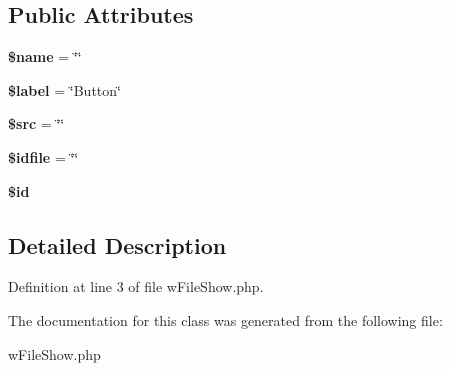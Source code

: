 \subsection*{Public Attributes}
\begin{DoxyCompactItemize}
\item 
\hypertarget{classwFileShow_a7cb7cb1f8a1a63cc58bfae35b4d3b0e1}{
{\bfseries \$name} = \char`\"{}\char`\"{}}
\label{classwFileShow_a7cb7cb1f8a1a63cc58bfae35b4d3b0e1}

\item 
\hypertarget{classwFileShow_af9bad721eb1965e28425293be077d0c1}{
{\bfseries \$label} = \char`\"{}Button\char`\"{}}
\label{classwFileShow_af9bad721eb1965e28425293be077d0c1}

\item 
\hypertarget{classwFileShow_a2d70e3621919385dd5e342c8b6020ddc}{
{\bfseries \$src} = \char`\"{}\char`\"{}}
\label{classwFileShow_a2d70e3621919385dd5e342c8b6020ddc}

\item 
\hypertarget{classwFileShow_afaa5b90cfa019acbf02badd102295c33}{
{\bfseries \$idfile} = \char`\"{}\char`\"{}}
\label{classwFileShow_afaa5b90cfa019acbf02badd102295c33}

\item 
\hypertarget{classwFileShow_ad1a9655f9046ea108b06781e95d950e0}{
{\bfseries \$id}}
\label{classwFileShow_ad1a9655f9046ea108b06781e95d950e0}

\end{DoxyCompactItemize}


\subsection{Detailed Description}


Definition at line 3 of file wFileShow.php.



The documentation for this class was generated from the following file:\begin{DoxyCompactItemize}
\item 
wFileShow.php\end{DoxyCompactItemize}

